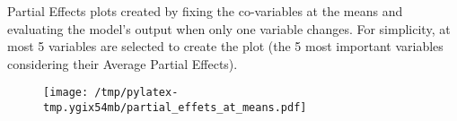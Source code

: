 \documentclass{article}%
\begin{document}
                Partial Effects plots created by fixing the co-variables at
                the means and evaluating the model's output when only one
                variable changes. For simplicity, at most 5 variables are
                selected to create the plot (the 5 most important variables
                considering their Average Partial Effects).

                \vfill%


\begin{figure}[H]%
\centering%
\texttt{[image: /tmp/pylatex-tmp.ygix54mb/partial\_effets\_at\_means.pdf]}%
\end{figure}

%
\vfill \pagebreak

%
\end{document}
